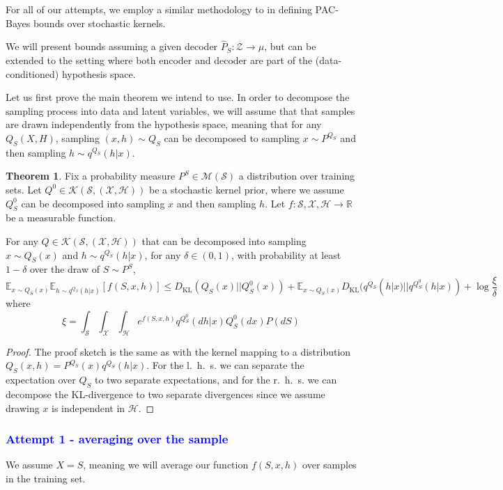 \documentclass[letterpaper]{article}
\theoremstyle{definition}
\newtheorem{theorem}{Theorem}
\newcommand{\LF}[1]{{\textcolor{blue}{#1}}}
\begin{document}
For all of our attempts, we employ a similar methodology to \citet{Rivasplata2020} in defining PAC-Bayes bounds over stochastic kernels.

We will present bounds assuming a given decoder $\hat{P}_S: \mathcal{Z}\rightarrow \mu$, but can be extended to the setting where both encoder and decoder are part of the (data-conditioned) hypothesis space.

Let us first prove the main theorem we intend to use. In order to  decompose the sampling process into data and latent variables, we will assume that that samples are drawn independently from the hypothesis space, meaning that for any $Q_S(X,H)$, sampling $(x,h)\sim Q_S$ can be decomposed to sampling $x\sim P^{Q_S}$ and then sampling $h\sim q^{Q_S}(h|x)$.

\begin{theorem} \label{thm:rivasplata-conditioned}
    Fix a probability measure $P^S\in \mathcal{M}(\mathcal{S})$ a distribution over training sets.
    Let $Q^0\in \mathcal{K}(\mathcal{S},(\mathcal{X},\mathcal{H}))$ be a stochastic kernel prior, where we assume $Q^0_S$ can be decomposed into sampling $x$ and then sampling $h$.
    Let $f:\mathcal{S},\mathcal{X},\mathcal{H}\rightarrow \mathbb{R}$ be a measurable function.

    For any $Q\in \mathcal{K}(\mathcal{S},(\mathcal{X},\mathcal{H}))$ that can be decomposed into sampling $x\sim Q_S(x)$ and $h\sim q^{Q_S}(h|x)$, for any $\delta\in (0,1)$, with probability at least $1-\delta$ over the draw of $S\sim P^S$,
    $$\mathbb{E}_{x\sim Q_S(x)}\mathbb{E}_{h\sim q^{Q_S}(h|x)}[f(S,x,h)]\leq D_{\mathrm{KL}}(Q_S(x)||Q^0_S(x))+\mathbb{E}_{x\sim Q_S(x)}D_{\mathrm{KL}}( q^{Q_S}(h|x)|| q^{Q^0_S}(h|x))+\log\frac{\xi}{\delta}$$
    where $$\xi=\int_{\mathcal{S}}\int_{\mathcal{X}}\int_{\mathcal{H}}e^{f(S,x,h)}q^{Q^0_S}(dh|x)Q^0_S(dx)P(dS)$$
\end{theorem}

\begin{proof}
    The proof sketch is the same as \citet{Rivasplata2020} with the kernel mapping to a distribution $Q_S(x,h)=P^{Q_S}(x)q^{Q_S}(h|x)$.
    For the l.\ h.\ s. we can separate the expectation over $Q_S$ to two separate expectations, and for the r.\ h.\ s. we can decompose the KL-divergence to two separate divergences since we assume drawing $x$ is independent in $\mathcal{H}$.
\end{proof}

\LF{\subsubsection{Attempt 1 - averaging over the sample}}
We assume $X=S$, meaning we will average our function $f(S,x,h)$ over samples in the training set.
\end{document}
